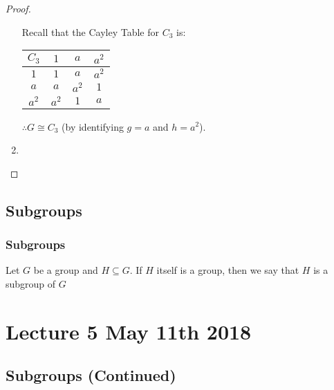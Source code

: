 \documentclass[notoc,notitlepage]{tufte-book}
\begin{document}
\begin{proof}
\begin{enumerate}
      Recall that the Cayley Table for $C_3$ is:
      \begin{center}
        \begin{tabular}{c | c c c}
        $C_3$ & $1$   & $a$   & $a^2$ \\
        \hline
        $1$   & $1$   & $a$   & $a^2$ \\
        $a$   & $a$   & $a^2$ & $1$ \\
        $a^2$ & $a^2$ & $1$   & $a$
        \end{tabular}
      \end{center}
      $\therefore G \cong C_3$ (by identifying $g = a$ and $h = a^2$).

    \item {}
  \end{enumerate}
\end{proof}



\section{Subgroups}
\label{sec:subgroups}

\subsection{Subgroups}
\label{sub:subgroups}

\begin{defn}[Subgroup]\label{defn:subgroup}
  Let $G$ be a group and $H \subseteq G$. If $H$ itself is a group, then we say that $H$ is a subgroup of $G$
\end{defn}




\chapter{Lecture 5 May 11th 2018}
\label{chp:lecture_5_may_11th_2018}

\section{Subgroups (Continued)}
\label{sec:subgroups_continued}
\end{document}
